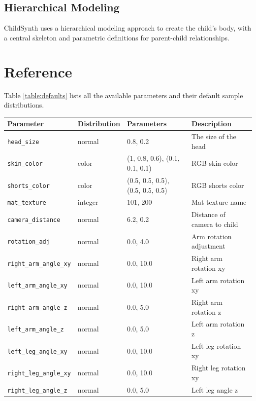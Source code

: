 \documentclass{article}
\begin{document}
\subsection{Hierarchical Modeling}
ChildSynth uses a hierarchical modeling approach to create the child's body, with a central skeleton and parametric definitions for parent-child relationships. 

\section{Reference}

Table \ref{table:defaults} lists all the available parameters and their default sample distributions.

\begin{table}[h]
    \centering
    {\scriptsize
    \begin{tabular}{|l|l|l|l|}
    \hline
    \textbf{Parameter} & \textbf{Distribution} & \textbf{Parameters} & \textbf{Description} \\ 
    \hline
    \texttt{head\_size} & normal & 0.8, 0.2 & The size of the head\\ 
    \texttt{skin\_color} & color & (1, 0.8, 0.6), (0.1, 0.1, 0.1) & RGB skin color\\ 
    \texttt{shorts\_color} & color & (0.5, 0.5, 0.5), (0.5, 0.5, 0.5) & RGB shorts color \\ 
    \texttt{mat\_texture} & integer & 101, 200 & Mat texture name \\ 
    \texttt{camera\_distance} & normal & 6.2, 0.2 & Distance of camera to child \\ 
    \texttt{rotation\_adj} & normal & 0.0, 4.0 &  Arm rotation adjustment\\ 
    \texttt{right\_arm\_angle\_xy} & normal & 0.0, 10.0 &  Right arm rotation xy\\ 
    \texttt{left\_arm\_angle\_xy} & normal & 0.0, 10.0 &  Left arm rotation xy\\ 
    \texttt{right\_arm\_angle\_z} & normal & 0.0, 5.0 &  Right arm rotation z\\ 
    \texttt{left\_arm\_angle\_z} & normal & 0.0, 5.0 &  Left arm rotation z\\ 
    \texttt{left\_leg\_angle\_xy} & normal & 0.0, 10.0 & Left leg rotation xy  \\ 
    \texttt{right\_leg\_angle\_xy} & normal & 0.0, 10.0 & Right leg rotation xy  \\ 
    \texttt{right\_leg\_angle\_z} & normal & 0.0, 5.0 &  Left leg angle z\\

\end{tabular}}
\end{table}
\end{document}
